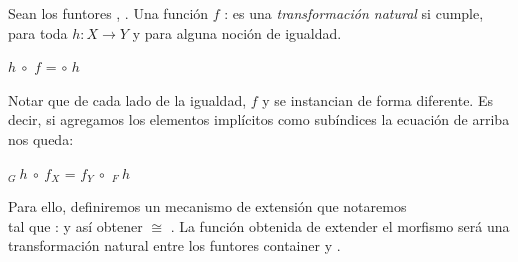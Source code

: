 \begin{definition} Sean los funtores ,   \AgdaSymbol{:}  \AgdaSymbol{$\to$} . Una función $f$ : \AgdaSymbol{$\forall$}   \AgdaSymbol{$\to$}   es una {\it transformación natural} si cumple, para toda $h : X \to Y$ y para alguna noción de igualdad.

\sangrar
{} $h\ \circ$ $f$ =  $\circ$  $h$

Notar que de cada lado de la igualdad, $f$ y  se instancian de forma diferente. Es decir, si agregamos los elementos implícitos como subíndices la ecuación de arriba nos queda: 

\sangrar
{}$_{G}\ h\ \circ\ f_{X}$ = $f_{Y}\ \circ$ $_{F}\ h$
\end{definition}

Para ello, definiremos un mecanismo de extensión que notaremos \agdaExtMorph{$\_$}\\ tal que
 : \AgdaSymbol{$\forall$}   \AgdaSymbol{$\to$}  
y así obtener
 $\cong$ . La función  obtenida de extender el morfismo  será una transformación natural entre los funtores container  y .

\vspace{2ex}

